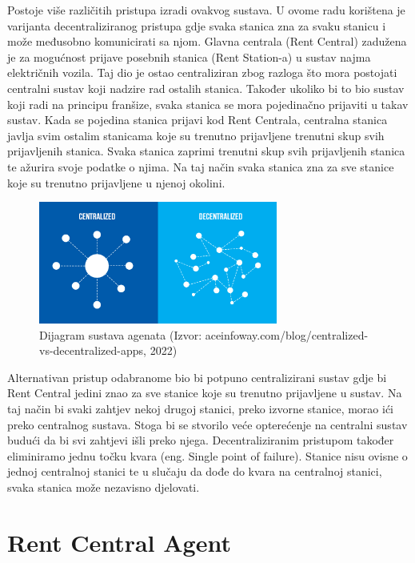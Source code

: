 \documentclass{foi}
\begin{document}
Postoje više različitih pristupa izradi ovakvog sustava. U ovome radu korištena je varijanta decentraliziranog pristupa gdje svaka stanica zna za svaku stanicu i može međusobno komunicirati sa njom. Glavna centrala (Rent Central) zadužena je za mogućnost prijave posebnih stanica (Rent Station-a) u sustav najma električnih vozila. Taj dio je ostao centraliziran zbog razloga što mora postojati centralni sustav koji nadzire rad ostalih stanica. Također ukoliko bi to bio sustav koji radi na principu franšize, svaka stanica se mora pojedinačno prijaviti u takav sustav. Kada se pojedina stanica prijavi kod Rent Centrala, centralna stanica javlja svim ostalim stanicama koje su trenutno prijavljene trenutni skup svih prijavljenih stanica. Svaka stanica zaprimi trenutni skup svih prijavljenih stanica te ažurira svoje podatke o njima. Na taj način svaka stanica zna za sve stanice koje su trenutno prijavljene u njenoj okolini.

\begin{figure}[h!]
	\centering
	\includegraphics[width=0.7\textwidth]{slike/decentralized.jpg}
	\caption{Dijagram sustava agenata (Izvor: aceinfoway.com/blog/centralized-vs-decentralized-apps, 2022)}
\end{figure}

Alternativan pristup odabranome bio bi potpuno centralizirani sustav gdje bi Rent Central jedini znao za sve stanice koje su trenutno prijavljene u sustav. Na taj način bi svaki zahtjev nekoj drugoj stanici, preko izvorne stanice, morao ići preko centralnog sustava. Stoga bi se stvorilo veće opterećenje na centralni sustav budući da bi svi zahtjevi išli preko njega. Decentraliziranim pristupom također eliminiramo jednu točku kvara (eng. Single point of failure). Stanice nisu ovisne o jednoj centralnoj stanici te u slučaju da dođe do kvara na centralnoj stanici, svaka stanica može nezavisno djelovati.
\pagebreak

\section{Rent Central Agent}
\end{document}
